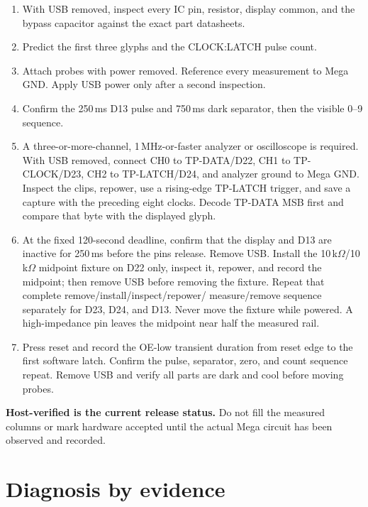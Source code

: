 \documentclass[11pt]{article}
\begin{document}
\begin{enumerate}
  \item With USB removed, inspect every IC pin, resistor, display common, and
        the bypass capacitor against the exact part datasheets.
  \item Predict the first three glyphs and the CLOCK:LATCH pulse count.
  \item Attach probes with power removed. Reference every measurement to Mega
        GND. Apply USB power only after a second inspection.
  \item Confirm the 250\,ms D13 pulse and 750\,ms dark separator, then the
        visible 0--9 sequence.
  \item A three-or-more-channel, 1\,MHz-or-faster analyzer or oscilloscope is
        required. With USB removed, connect CH0 to TP-DATA/D22,
        CH1 to TP-CLOCK/D23, CH2 to TP-LATCH/D24, and analyzer ground to Mega
        GND. Inspect the clips, repower, use a rising-edge TP-LATCH trigger,
        and save a capture with the preceding eight clocks. Decode TP-DATA MSB
        first and compare that byte with the displayed glyph.
  \item At the fixed 120-second deadline, confirm that the display and D13 are
        inactive for 250\,ms before the pins release. Remove USB. Install the
        10\,k\(\Omega\)/10\,k\(\Omega\) midpoint fixture on D22 only, inspect
        it, repower, and record the midpoint; then remove USB before removing
        the fixture. Repeat that complete remove/install/inspect/repower/
        measure/remove sequence separately for D23, D24, and D13. Never move
        the fixture while powered. A high-impedance pin leaves the midpoint
        near half the measured rail.
  \item Press reset and record the OE-low transient duration from reset edge
        to the first software latch. Confirm the pulse, separator, zero, and
        count sequence repeat. Remove USB and verify all parts are dark and
        cool before moving probes.
\end{enumerate}

\textbf{Host-verified is the current release status.} Do not fill the measured
columns or mark hardware accepted until the actual Mega circuit has been
observed and recorded.

\newpage
\section{Diagnosis by evidence}
\end{document}
